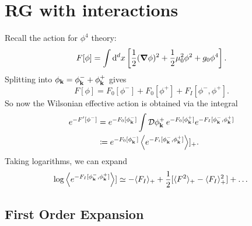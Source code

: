 
\section{RG with interactions}%
\label{sec:rg_with_interactions}

Recall the action for $\phi^4$ theory:
\begin{equation}
  F[\phi] = \int \dd[d]{x} \left[ \frac{1}{2} (\grad \phi)^2 + \frac{1}{2} \mu_0^2 \phi^2 + g_0 \phi^4 \right].
\end{equation}
Splitting into $\phi_{\vb{k}} =  \phi^-_{\vb{k}} + \phi^+_{\vb{k}}$ gives
\begin{equation}
  F[\phi] = F_0 [\phi^-] + F_0 [\phi^+] + F_I [\phi^-, \phi^+].
\end{equation}
So now the Wilsonian effective action is obtained via the integral
\begin{align}
  e^{-F'[\phi^-]} &= e^{-F_0 [\phi_{\vb{k}}^-]} \int \mathop{\mathcal{D} \phi^+_{\vb{k}}} e^{-F_0 [\phi^+_{\vb{k}}]} e^{-F_I[\phi^-_{\vb{k}}, \phi^+_{\vb{k}}]} \\
		  &\coloneqq e^{-F_0 [\phi^-_{\vb{k}}]} \left\langle e^{-F_i[\phi^-_{\vb{k}}, \phi^+_{\vb{k}}]} \right\rangle]_+.
\end{align}
Taking logarithms, we can expand
\begin{equation}
  \log \left\langle e^{-F_I[\phi^-_{\vb{k}}, \phi^+_{\vb{k}}]} \right\rangle] \simeq - \langle F_I \rangle_+ + \frac{1}{2}[\langle F^2 \rangle_+ - \langle F_I \rangle_+^2] + \dots
\end{equation}

\subsection*{First Order Expansion}%

